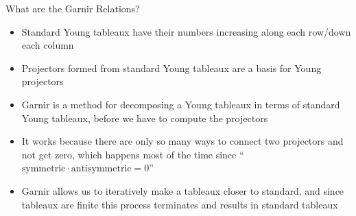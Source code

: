 \documentclass{beamer}
\begin{document}
    \begin{frame}{What are the Garnir Relations?}
        \begin{itemize}
            \item Standard Young tableaux have their numbers increasing along each row/down each column
            \item Projectors formed from standard Young tableaux are a basis for Young projectors
            \item Garnir is a method for decomposing a Young tableaux in terms of standard Young tableaux, before we have to compute the projectors
            \item It works because there are only so many ways to connect two projectors and not get zero, which happens most of the time since \enquote{\(\text{symmetric} \cdot \text{antisymmetric} = 0\)}
            \item Garnir allows us to iteratively make a tableaux closer to standard, and since tableaux are finite this process terminates and results in standard tableaux
        \end{itemize}
    \end{frame}
    
\end{document}

